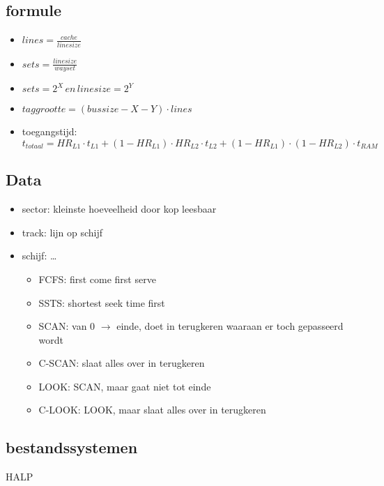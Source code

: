 \documentclass[11pt]{article}
\let\originalitem\item
\renewcommand{\item}{\originalitem[]}
\newcommand{\Newpage}{\end{preview}\begin{preview}}
\begin{document}
\begin{preview}
\subsection{formule}
\begin{itemize}
	\item $lines = \frac{cache}{linesize}$
	\item $sets = \frac{linesize}{wayset}$
	\item $sets = 2^X \, en \, linesize = 2^Y$
	\item $taggrootte = (bussize - X - Y) \cdot lines$
	\item toegangstijd: $t_{totaal} = HR_{L1} \cdot t_{L1} + (1 - HR_{L1}) \cdot HR_{L2} \cdot t_{L2} + (1 - HR_{L1}) \cdot (1 - HR_{L2}) \cdot t_{RAM}$
\end{itemize}


\Newpage

\section{Data}

\begin{itemize}
	\item sector: kleinste hoeveelheid door kop leesbaar
	\item track: lijn op schijf
	\item schijf: \dots
	\begin{itemize}
		\item FCFS: first come first serve
		\item SSTS: shortest seek time first
		\item SCAN: van 0 $\rightarrow$ einde, doet in terugkeren waaraan er toch gepasseerd wordt
		\item C-SCAN: slaat alles over in terugkeren
		\item LOOK: SCAN, maar gaat niet tot einde
		\item C-LOOK: LOOK, maar slaat alles over in terugkeren
	\end{itemize}
\end{itemize}

\subsection{bestandssystemen}

HALP %

\end{preview}
\end{document}
